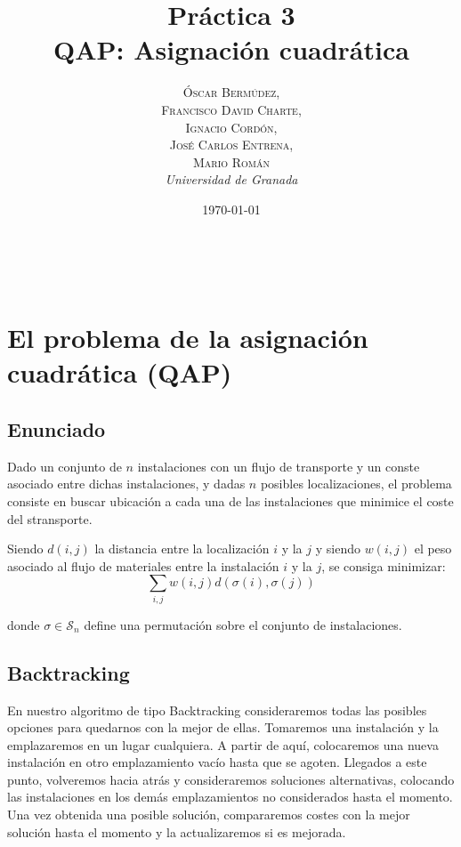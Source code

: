 \documentclass[a4paper, 11pt]{article} %
\title{\textbf{Práctica 3}\\ %
QAP: Asignación cuadrática} %
\author{\textsc{Óscar Bermúdez,\\Francisco David Charte,\\Ignacio Cordón,\\José Carlos Entrena,\\Mario Román} %
\\{\textit{Universidad de Granada}}} %
\date{\today} %
\makeatletter
\renewcommand{\maketitle}{ %
\begin{flushright} %
{\LARGE\@title} %

\vspace{50pt} %

{\large\@author} %
\\\@date %

\vspace{40pt} %
\end{flushright}
}
\makeatother
\begin{document}
\maketitle %

\renewcommand{\abstractname}{Resumen} %
\begin{abstract}
\end{abstract}
{\parskip=2pt
\tableofcontents
}
\pagebreak

\section{El problema de la asignación cuadrática (QAP)}
      \subsection{Enunciado}
	Dado un conjunto de $n$ instalaciones con un flujo de transporte y
	un conste asociado entre dichas instalaciones, y dadas $n$ posibles localizaciones,
	el problema consiste en buscar ubicación a cada una de las instalaciones que
	minimice el coste del stransporte.
	
	Siendo $d(i,j)$ la distancia entre la localización $i$ y la $j$
	y siendo $w(i,j)$ el peso asociado al flujo de materiales entre la instalación
	$i$ y la $j$, se consiga minimizar:
	\begin{equation}
	\sum_{i,j} w(i,j) d(\sigma(i),\sigma(j))
	\label{coste}
	\end{equation}

	donde $\sigma \in \mathcal{S}_n$ define una permutación sobre el conjunto de instalaciones.

    
      \subsection{Backtracking}
	En nuestro algoritmo de tipo Backtracking consideraremos todas las posibles opciones para quedarnos con la mejor de ellas.
	Tomaremos una instalación y la emplazaremos en un lugar cualquiera. A partir de aquí, colocaremos una nueva instalación
	en otro emplazamiento vacío hasta que se agoten. Llegados a este punto, volveremos hacia atrás y consideraremos soluciones
	alternativas, colocando las instalaciones en los demás emplazamientos no considerados hasta el momento. Una vez obtenida una
	posible solución, compararemos costes con la mejor solución hasta el momento y la actualizaremos si es mejorada.       
	
\end{document}
